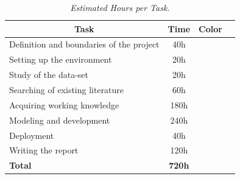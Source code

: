 \begin{table}[H] \centering
  \begin{tabular}{| l | c | c | c |}
    \hline
    \multicolumn{1}{|c|}{\textbf{Task}} & \multicolumn{1}{c|}{\textbf{Time}} & \multicolumn{1}{c|}{\textbf{Color}} \\
    \hline
    Definition and boundaries of the project & 40h & \cellcolor{red!50} \\
    \hline
    Setting up the environment & 20h & \cellcolor{lime!50} \\
    \hline
    Study of the data-set & 20h & \cellcolor{blue!40} \\
    \hline
    Searching of existing literature & 60h & \cellcolor{teal!50} \\
    \hline
    Acquiring working knowledge & 180h & \cellcolor{amber!30} \\
    \hline
    Modeling and development & 240h & \cellcolor{black!70} \\
    \hline
    Deployment & 40h & \cellcolor{gray!50} \\
    \hline
    Writing the report & 120h & \cellcolor{orange!50} \\
    \hline
    \textbf{Total} & \textbf{720h} & \\
    \hline
  \end{tabular}
  \caption[Estimated Hours per Task.]{\textit{Estimated Hours per Task. }}
  {\label{table:timeline_tasks}}
\end{table}

